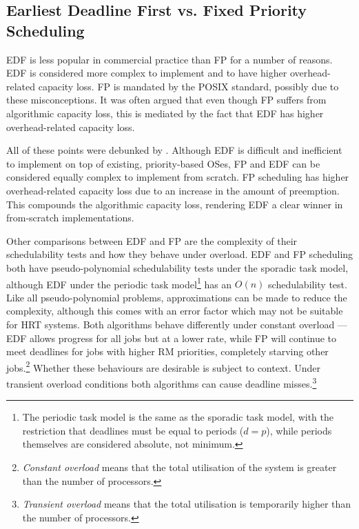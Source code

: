 \subsection{Earliest Deadline First vs. Fixed Priority Scheduling}

\gls{EDF} is less popular in commercial practice than \gls{FP} for a number of reasons.
\gls{EDF} is considered more complex to implement and to have higher overhead-related capacity loss.
\gls{FP} is mandated by the P\gls{OS}IX standard, possibly due to these misconceptions.
It was often argued that even though \gls{FP} suffers from algorithmic capacity loss, this is mediated by the fact that \gls{EDF} has higher overhead-related capacity loss.

All of these points were debunked by \citet{Buttazzo_2005}.
Although \gls{EDF} is difficult and inefficient to implement on top of existing, priority-based \gls{OS}es, \gls{FP} and \gls{EDF} can be considered equally complex to implement from scratch.
\gls{FP} scheduling has higher overhead-related capacity loss due to an increase in the amount of preemption.
This compounds the algorithmic capacity loss, rendering \gls{EDF} a clear winner in from-scratch implementations.

Other comparisons between \gls{EDF} and \gls{FP} are the complexity of their schedulability tests and how
they behave under overload.
\gls{EDF} and \gls{FP} scheduling both have pseudo-polynomial schedulability tests under the sporadic task model, although \gls{EDF} under the periodic task model\footnote{The periodic task model is the same as the sporadic task model, with the restriction that deadlines must be equal to periods ($d = p$), while periods themselves are considered absolute, not minimum.} has an $O(n)$ schedulability test.
Like all pseudo-polynomial problems, approximations can be made to reduce the complexity, although this comes with an error factor which may not be suitable for \gls{HRT} systems.
Both algorithms behave differently under constant overload --- \gls{EDF} allows progress for all jobs but at a lower rate, while \gls{FP} will continue to meet deadlines for jobs with higher \gls{RM} priorities, completely starving other jobs.\footnote{\emph{Constant overload} means that the total utilisation of the system is greater than the number of processors.}
Whether these behaviours are desirable is subject to context.
Under transient overload conditions both algorithms can cause deadline misses.\footnote{\emph{Transient overload} means that the total utilisation is temporarily higher than the number of processors.}


